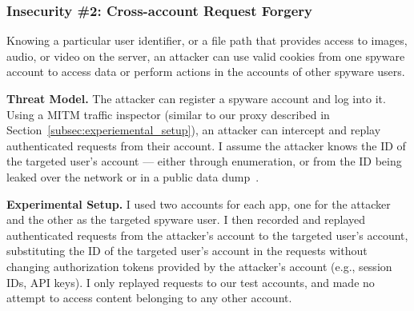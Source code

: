 
\subsubsection*{Insecurity \#2: Cross-account Request Forgery}

Knowing a particular user identifier, or a file path that provides access to images, audio, or video on the server, an attacker can use valid
cookies from one spyware account to access data or perform actions in
the accounts of other spyware users.

\textbf{Threat Model.} The attacker can register a spyware account and
log into it. Using a MITM traffic inspector (similar to our proxy
described in Section~\ref{subsec:experiemental_setup}), an attacker
can intercept and replay authenticated requests from their account. I
assume the attacker knows the ID of the targeted user's account ---
either through enumeration, or from the ID being leaked over the
network or in a public data dump~\cite{mSpybrea38:online,
  Companyt8:online, HackerSt66:online, Cerberus12:online,
  Stalkerw59:online}.


\textbf{Experimental Setup.} I used two accounts for each app, one
for the attacker and the other as the targeted spyware user.  I then
recorded and replayed authenticated requests from the attacker's
account to the targeted user's account, substituting the ID of the
targeted user's account in the requests without changing authorization
tokens provided by the attacker's account (e.g., session IDs, API
keys).  I only replayed requests to our test accounts, and
made no attempt to access content belonging to any other account.


